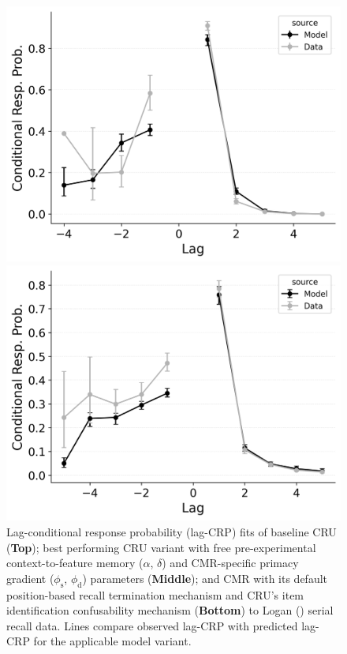 \documentclass[
  man,
  floatsintext,
  longtable,
  nolmodern,
  notxfonts,
  notimes,
  draftfirst,
  colorlinks=true,linkcolor=blue,citecolor=blue,urlcolor=blue]{apa7}
\begin{document}
\begin{figure}

\caption{\label{fig-serial-crp}Lag-conditional response probability
(lag-CRP) fits of baseline CRU (\textbf{Top}); best performing CRU
variant with free pre-experimental context-to-feature memory
(\(\alpha\), \(\delta\)) and CMR-specific primacy gradient
(\(\phi_\text{s}\), \(\phi_\text{d}\)) parameters (\textbf{Middle}); and
CMR with its default position-based recall termination mechanism and
CRU's item identification confusability mechanism (\textbf{Bottom}) to
Logan () serial recall data. Lines
compare observed lag-CRP with predicted lag-CRP for the applicable model
variant.}

\begin{minipage}{0.33\linewidth}
\includegraphics{figures/bw_Gordon2021_BaseCRU_Confusable_Fitting_crp_LL5.png}\end{minipage}%
%
\begin{minipage}{0.33\linewidth}
\includegraphics{figures/bw_Gordon2021_BaseCRU_Confusable_Fitting_crp_LL6.png}\end{minipage}%

\end{figure}
\end{document}
